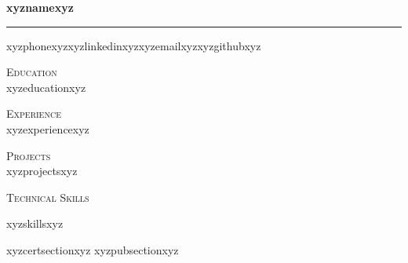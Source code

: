 \documentclass[11pt,letterpaper]{article}
\newcommand{\resumesection}[1]{%
  \vspace{10pt}%
  {\textsc{#1}}%
  \vspace{4pt}%
}
\begin{document}
{\centering
  {\Large\bfseries xyznamexyz}\\[6pt]
  \hrule
  \vspace{4pt}
  \small xyzphonexyz\quad xyzlinkedinxyz\quad xyzemailxyz\quad xyzgithubxyz\\
}

\vspace{8pt}

\resumesection{Education}\\
xyzeducationxyz

\resumesection{Experience}\\
xyzexperiencexyz

\resumesection{Projects}\\
xyzprojectsxyz

\resumesection{Technical Skills}\\
\begin{itemize}[leftmargin=1.5em,itemsep=2pt,topsep=4pt]
xyzskillsxyz
\end{itemize}

xyzcertsectionxyz
xyzpubsectionxyz
\end{document}
